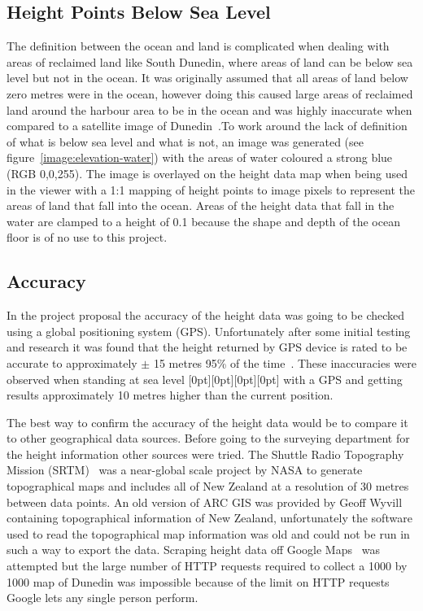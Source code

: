 \documentclass[12pt]{report}
\newcommand{\note}[1]{\raisebox{0pt}[0pt][0pt]{\pdfcomment[open=true]{#1}}}
\newcommand{\notedme}[1]{\note{#1}}
\begin{document}
\subsection{Height Points Below Sea Level}
The definition between the ocean and land is complicated when dealing with areas of reclaimed land like South Dunedin, where areas of land can be below sea level but not in the ocean. It was originally assumed that all areas of land below zero metres were in the ocean, however doing this caused large areas of reclaimed land around the harbour area to be in the ocean and was highly inaccurate when compared to a satellite image of Dunedin~\cite{gmaps}.To work around the lack of definition of what is below sea level and what is not, an image was generated (see figure~\ref{image:elevation-water}) with the areas of water coloured a strong blue (RGB 0,0,255). The image is overlayed on the height data map when being used in the viewer with a 1:1 mapping of height points to image pixels to represent the areas of land that fall into the ocean. Areas of the height data that fall in the water are clamped to a height of 0.1 because the shape and depth of the ocean floor is of no use to this project.

\subsection{Accuracy}
In the project proposal the accuracy of the height data was going to be checked using a global positioning system (GPS). Unfortunately after some initial testing and research it was found that the height returned by GPS device is rated to be accurate to approximately $\pm$ 15 metres 95\% of the time~\cite{gpsaltitude}. These inaccuracies were observed when standing at sea level \note{on a beach don't think I need to say this}\notedme{what about tides?} with a GPS and getting results approximately 10 metres higher than the current position.

The best way to confirm the accuracy of the height data would be to compare it to other geographical data sources. Before going to the surveying department for the height information other sources were tried. The Shuttle Radio Topography Mission (SRTM)~\cite{srtm} was a near-global scale project by NASA to generate topographical maps and includes all of New Zealand at a resolution of 30 metres between data points. An old version of ARC GIS was provided by Geoff Wyvill containing topographical information of New Zealand, unfortunately the software used to read the topographical map information was old and could not be run in such a way to export the data. Scraping height data off Google Maps~\cite{gmaps} was attempted but the large number of HTTP requests required to collect a 1000 by 1000 map of Dunedin was impossible because of the limit on HTTP requests Google lets any single person perform.
\end{document}
